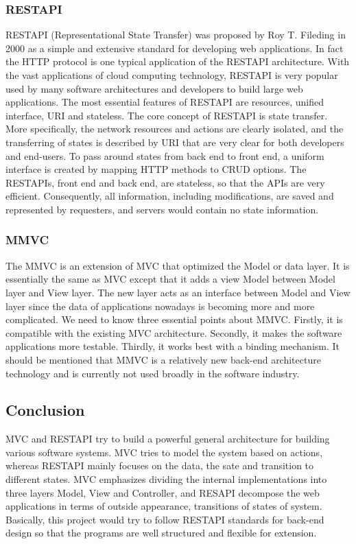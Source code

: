 \documentclass[letterpaper,10pt]{article}
\begin{document}
		\subsubsection{RESTAPI}
    RESTAPI (Representational State Transfer) was proposed by Roy T. Fileding in 2000 as a simple and extensive standard for developing web applications. In fact the HTTP protocol is one typical application of the RESTAPI architecture. With the vast applications of cloud computing technology, RESTAPI is very popular used by many software architectures and developers to build large web applications. The most essential features of RESTAPI are resources, unified interface, URI and stateless.
	The core concept of RESTAPI is state transfer. More specifically, the network resources and actions are clearly isolated, and the transferring of states is described by URI that are very clear for both developers and end-users. To pass around states from back end to front end, a uniform interface is created by mapping HTTP methods to CRUD options. The RESTAPIs, front end and back end, are stateless, so that the APIs are very efficient. Consequently, all information, including modifications, are saved and represented by requesters, and servers would contain no state information.

		\subsubsection{MMVC}
    The MMVC is an extension of MVC that optimized the Model or data layer. It is essentially the same as MVC except that it adds a view Model between Model layer and View layer. The new layer acts as an interface between Model and View layer since the data of applications nowadays is becoming more and more complicated. We need to know three essential points about MMVC. Firstly, it is compatible with the existing MVC architecture. Secondly, it makes the software applications more testable. Thirdly, it works best with a binding mechanism. It should be mentioned that MMVC is a relatively new back-end architecture technology and is currently not used broadly in the software industry.


	\subsection{Conclusion}
  		MVC and RESTAPI try to build a powerful general architecture for building various software systems. MVC tries to model the system based on actions, whereas RESTAPI mainly focuses on the data, the sate and transition to different states. MVC emphasizes dividing the internal implementations into three layers Model, View and Controller, and RESAPI decompose the web applications in terms of outside appearance, transitions of states of system. Basically, this project would try to follow RESTAPI standards for back-end design so that the programs are well structured and flexible for extension.
\end{document}
